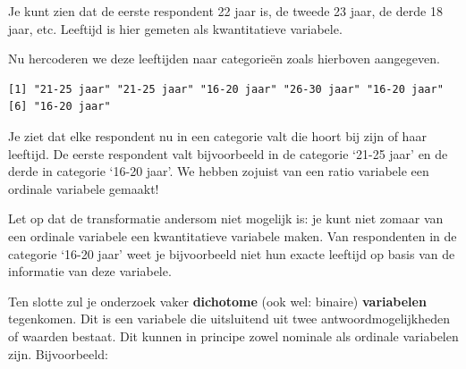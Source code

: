 \documentclass[
  letterpaper,
  DIV=11,
  numbers=noendperiod]{scrreprt}
\newenvironment{Shaded}{\begin{snugshade}}{\end{snugshade}}
\newcommand{\CommentTok}[1]{\textcolor[rgb]{0.37,0.37,0.37}{#1}}
\newcommand{\DecValTok}[1]{\textcolor[rgb]{0.68,0.00,0.00}{#1}}
\newcommand{\FunctionTok}[1]{\textcolor[rgb]{0.28,0.35,0.67}{#1}}
\newcommand{\NormalTok}[1]{\textcolor[rgb]{0.00,0.23,0.31}{#1}}
\newcommand{\OtherTok}[1]{\textcolor[rgb]{0.00,0.23,0.31}{#1}}
\newcommand{\SpecialCharTok}[1]{\textcolor[rgb]{0.37,0.37,0.37}{#1}}
\newcommand{\StringTok}[1]{\textcolor[rgb]{0.13,0.47,0.30}{#1}}
\begin{document}
Je kunt zien dat de eerste respondent 22 jaar is, de tweede 23 jaar, de
derde 18 jaar, etc. Leeftijd is hier gemeten als kwantitatieve
variabele.

Nu hercoderen we deze leeftijden naar categorieën zoals hierboven
aangegeven.

\begin{Shaded}
\end{Shaded}

\begin{verbatim}
[1] "21-25 jaar" "21-25 jaar" "16-20 jaar" "26-30 jaar" "16-20 jaar"
[6] "16-20 jaar"
\end{verbatim}

Je ziet dat elke respondent nu in een categorie valt die hoort bij zijn
of haar leeftijd. De eerste respondent valt bijvoorbeeld in de categorie
`21-25 jaar' en de derde in categorie `16-20 jaar'. We hebben zojuist
van een ratio variabele een ordinale variabele gemaakt!

Let op dat de transformatie andersom niet mogelijk is: je kunt niet
zomaar van een ordinale variabele een kwantitatieve variabele maken. Van
respondenten in de categorie `16-20 jaar' weet je bijvoorbeeld niet hun
exacte leeftijd op basis van de informatie van deze variabele.

Ten slotte zul je onderzoek vaker \textbf{dichotome} (ook wel: binaire)
\textbf{variabelen} tegenkomen. Dit is een variabele die uitsluitend uit
twee antwoordmogelijkheden of waarden bestaat. Dit kunnen in principe
zowel nominale als ordinale variabelen zijn. Bijvoorbeeld:
\end{document}
